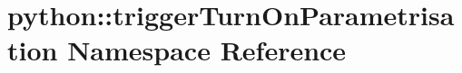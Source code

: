 \hypertarget{namespacepython_1_1triggerTurnOnParametrisation}{
\section{python::triggerTurnOnParametrisation Namespace Reference}
\label{namespacepython_1_1triggerTurnOnParametrisation}
}
